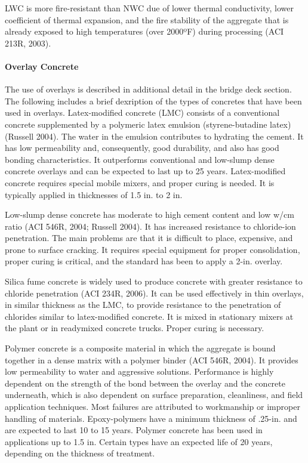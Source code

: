 LWC is more fire-resistant than NWC due of lower thermal conductivity, lower coefficient of thermal expansion, and the fire stability of the aggregate that is already exposed to high temperatures (over 2000ºF) during processing (ACI 213R, 2003).

\paragraph{Overlay Concrete}
The use of overlays is described in additional detail in the bridge deck section. The following includes a brief dexription of the types of concretes that have been used in overlays.  Latex-modified concrete (LMC) consists of a conventional concrete supplemented by a polymeric latex emulsion (styrene-butadine latex) (Russell 2004). The water in the emulsion contributes to hydrating the cement. It has low permeability and, consequently, good durability, and also has good bonding characteristics. It outperforms conventional and low-slump dense concrete overlays and can be expected to last up to 25 years. Latex-modified concrete requires special mobile mixers, and proper curing is needed. It is typically applied in thicknesses of 1.5 in.  to 2 in.

Low-slump dense concrete has moderate to high cement content and low w/cm ratio (ACI 546R, 2004; Russell 2004). It has increased resistance to chloride-ion penetration. The main problems are that it is difficult to place, expensive, and prone to surface cracking. It requires special equipment for proper consolidation, proper curing is critical, and the standard has been to apply a 2-in. overlay.

Silica fume concrete is widely used to produce concrete with greater resistance to chloride penetration (ACI 234R, 2006). It can be used effectively in thin overlays, in similar thickness as the LMC, to provide resistance to the penetration of chlorides similar to latex-modified concrete. It is mixed in stationary mixers at the plant or in readymixed concrete trucks. Proper curing is necessary.

Polymer concrete is a composite material in which the aggregate is bound together in a dense matrix with a polymer binder (ACI 546R, 2004). It provides low permeability to water and aggressive solutions. Performance is highly dependent on the strength of the bond between the overlay and the concrete underneath, which is also dependent on surface preparation, cleanliness, and field application techniques. Most failures are attributed to workmanship or improper handling of materials. Epoxy-polymers have a minimum thickness of .25-in. and are expected to last 10 to 15 years. Polymer concrete has been used in applications up to 1.5 in. Certain types have an expected life of 20 years, depending on the thickness of treatment.

